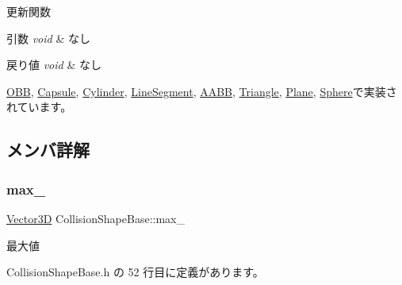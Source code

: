 更新関数 


\begin{DoxyParams}{引数}
{\em void} & なし \\
\hline
\end{DoxyParams}

\begin{DoxyRetVals}{戻り値}
{\em void} & なし \\
\hline
\end{DoxyRetVals}


\mbox{\hyperlink{class_o_b_b_af9b3e9a2d810f5b37cf849a3804d7bc7}{O\+BB}}, \mbox{\hyperlink{class_capsule_abfa1026590603a2971c5269171a50864}{Capsule}}, \mbox{\hyperlink{class_cylinder_a7b835c069d873b53d57fd01b9f44bacd}{Cylinder}}, \mbox{\hyperlink{class_line_segment_af38555a54ae3cae5e06876331b9d7522}{Line\+Segment}}, \mbox{\hyperlink{class_a_a_b_b_a0a96be8dec3969d893bf90d3f05e22b7}{A\+A\+BB}}, \mbox{\hyperlink{class_triangle_acc4ecbf029aafe3cda4e6a49218e2e0b}{Triangle}}, \mbox{\hyperlink{class_plane_a1dd55b527bae8194b21bf2009f53afb0}{Plane}}, \mbox{\hyperlink{class_sphere_a5e72970f207683a3cf5fe430f6a62e15}{Sphere}}で実装されています。



\subsection{メンバ詳解}
\mbox{\label{class_collision_shape_base_a4a9788a4a72f5dd77cd26a281c2d17e4}} 
\subsubsection{\texorpdfstring{max\+\_\+}{max\_}}
{\footnotesize\ttfamily \mbox{\hyperlink{class_vector3_d}{Vector3D}} Collision\+Shape\+Base\+::max\+\_\+\hspace{0.3cm}{\ttfamily [private]}}



最大値 



 Collision\+Shape\+Base.\+h の 52 行目に定義があります。

\mbox{\label{class_collision_shape_base_af6b4c8627469bfe135d02b67de688bac}} 
